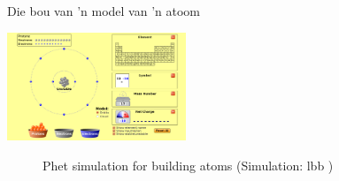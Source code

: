 \begin{groupdiscussion}{Die bou van  'n model van 'n atoom}
\begin{multicols}{2}
\end{multicols}
\begin{center}
 \includegraphics[width=0.4\textwidth]{photos/BuildAtom.png}
\end{center}

\end{groupdiscussion}      
    \setcounter{subfigure}{0}
	\begin{figure}[H] %
    \textnormal{Phet simulation for building atoms} \nopagebreak
  \label{m38806*phet!!!underscore!!!sim}\label{m38806*phet-simulation}
             { (Simulation:  lbb )}
 \end{figure}       


